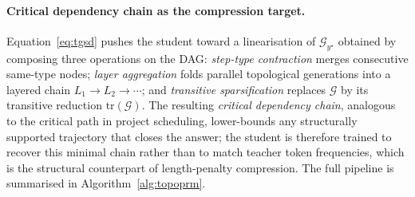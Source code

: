 \paragraph{Critical dependency chain as the compression target.}
Equation~\eqref{eq:tgsd} pushes the student toward a linearisation of $\mathcal{G}_{y^{\star}}$ obtained by composing three operations on the DAG: \emph{step-type contraction} merges consecutive same-type nodes; \emph{layer aggregation} folds parallel topological generations into a layered chain $L_1\!\to\!L_2\!\to\!\cdots$; and \emph{transitive sparsification} replaces $\mathcal{G}$ by its transitive reduction $\mathrm{tr}(\mathcal{G})$. The resulting \emph{critical dependency chain}, analogous to the critical path in project scheduling, lower-bounds any structurally supported trajectory that closes the answer; the student is therefore trained to recover this minimal chain rather than to match teacher token frequencies, which is the structural counterpart of length-penalty compression. The full pipeline is summarised in Algorithm~\ref{alg:topoprm}.
